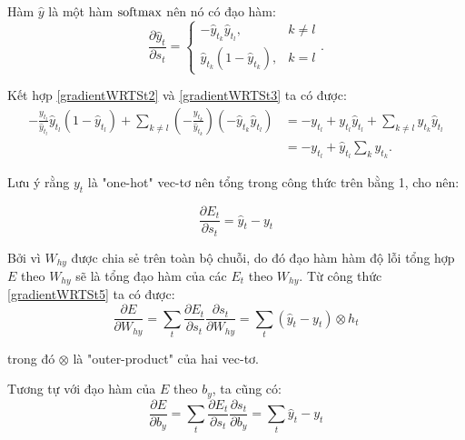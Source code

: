 Hàm $\hat{y}$ là một hàm $\mathrm{softmax}$ nên nó có đạo hàm:
\begin{equation} \label{gradientWRTSt3}
	\frac{\partial \hat{y}_{t}}{\partial s_{t}}=\left\{
		\begin{array}{lr}
			-\hat{y}_{t_k}\hat{y}_{t_l}, & k\neq l \\
			\hat{y}_{t_k}\left(1-\hat{y}_{t_k}\right), & k=l
		\end{array}
	\right..
\end{equation}

Kết hợp \ref{gradientWRTSt2} và \ref{gradientWRTSt3} ta có được:
\begin{subequations} \label{gradientWRTSt4}
\begin{align}
-\frac{y_{t_l}}{\hat{y}_{t_l}}\hat{y}_{t_l}\left(1-\hat{y}_{t_l}\right)+\sum_{k\ne l}{}\left(-\frac{y_{t_k}}{\hat{y}_{t_k}}\right)\left(-\hat{y}_{t_k}\hat{y}_{t_l}\right) 
&= -y_{t_l}+y_{t_l}\hat{y}_{t_l}+\sum_{k\ne l}{}y_{t_k}\hat{y}_{t_l} \\
&= -y_{t_l} + \hat{y}_{t_l}\sum_{k}{}y_{t_k}.
\end{align}
\end{subequations}

Lưu ý rằng $y_t$ là "one-hot" vec-tơ nên tổng trong công thức trên bằng 1, cho nên:

\begin{equation} \label{gradientWRTSt5}
	\frac{\partial{E_t}}{\partial{s_t}} = \hat{y}_t - y_t
\end{equation}

Bởi vì $W_{hy}$ được chia sẻ trên toàn bộ chuỗi, do đó đạo hàm hàm độ lỗi tổng hợp $E$ theo $W_{hy}$ sẽ là tổng đạo hàm của các $E_t$ theo $W_{hy}$. Từ công thức \ref{gradientWRTSt5} ta có được:
\begin{equation} \label{gradientWRTSt6}
	\frac{\partial{E}}{\partial{W_{hy}}} = \sum_{t} \frac{\partial{E_t}}{\partial{s_t}} \frac{\partial{s_t}}{\partial{W_{hy}}} = \sum_{t} \left(\hat{y}_t - y_t \right) \otimes h_t
\end{equation}

trong đó $\otimes$ là "outer-product" của hai vec-tơ.

Tương tự với đạo hàm của $E$ theo $b_y$, ta cũng có:
\begin{equation} \label{gradientWRTSt7}
	\frac{\partial{E}}{\partial{b_{y}}} = \sum_{t} \frac{\partial{E_t}}{\partial{s_t}} \frac{\partial{s_t}}{\partial{b_{y}}} = \sum_{t} \hat{y}_t - y_t
\end{equation}


